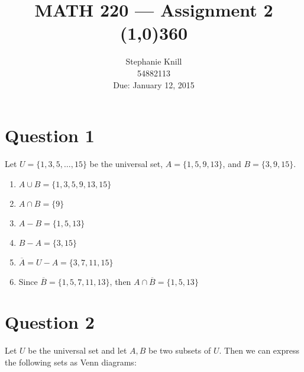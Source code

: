 \documentclass[11pt, oneside]{article}   	%
\begin{document}
\title{MATH 220 --- Assignment 2 \\
\line(1,0){360} }             %

\author{
Stephanie Knill \\
54882113 \\
Due: January 12, 2015}

\date{}                   %
\maketitle

\thispagestyle{empty}                   %



\section*{Question 1}

Let $U = \{1,3,5, \ldots , 15\}$ be the universal set, $A = \{1,5,9,13\}$, and $B=\{3,9,15\}$.

\begin{enumerate}[ (a)]           
    \item $A \cup B = \{1, 3, 5, 9, 13, 15\}$
    \item $A \cap B = \{9\}$
    \item $A - B = \{1, 5, 13\}$
    \item $B - A = \{3, 15\}$
    \item $\overline{A} = U - A = \{3, 7, 11, 15\}$
    \item Since $\overline{B} = \{1,5,7,11,13\}$, then $A \cap \overline{B} = \{1,5,13\}$   
\end{enumerate}


\section*{Question 2}

Let $U$ be the universal set and let $A, B$ be two subsets of $U$. Then we can express the following sets as Venn diagrams:
\end{document}
